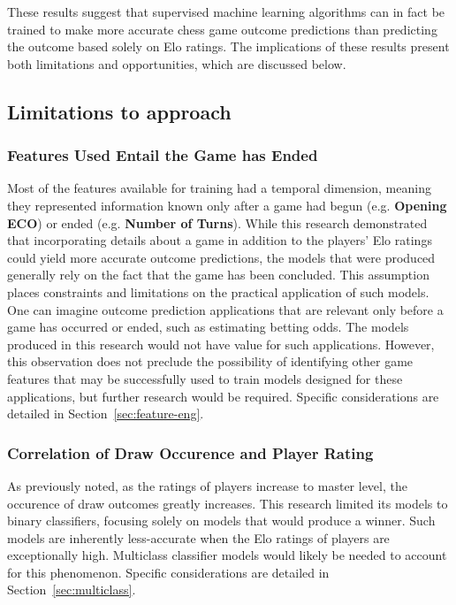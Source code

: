 \documentclass[12pt]{article}
\begin{document}
These results suggest that supervised machine learning algorithms can in fact be trained to make more accurate chess game outcome predictions than predicting the outcome based solely on Elo ratings. The implications of these results present both limitations and opportunities, which are discussed below.

\subsection{Limitations to approach}

\subsubsection{Features Used Entail the Game has Ended}
Most of the features available for training had a temporal dimension, meaning they represented information known only after a game had begun (e.g. \textbf{Opening ECO}) or ended (e.g. \textbf{Number of Turns}). While this research demonstrated that incorporating details about a game in addition to the players' Elo ratings could yield more accurate outcome predictions, the models that were produced generally rely on the fact that the game has been concluded. This assumption places constraints and limitations on the practical application of such models. One can imagine outcome prediction applications that are relevant only before a game has occurred or ended, such as estimating betting odds. The models produced in this research would not have value for such applications. However, this observation does not preclude the possibility of identifying other game features that may be successfully used to train models designed for these applications, but further research would be required. Specific considerations are detailed in Section~\ref{sec:feature-eng}.

\subsubsection{Correlation of Draw Occurence and Player Rating}
As previously noted, as the ratings of players increase to master level, the occurence of draw outcomes greatly increases. This research limited its models to binary classifiers, focusing solely on models that would produce a winner. Such models are inherently less-accurate when the Elo ratings of players are exceptionally high. Multiclass classifier models would likely be needed to account for this phenomenon. Specific considerations are detailed in Section~\ref{sec:multiclass}.
\end{document}
